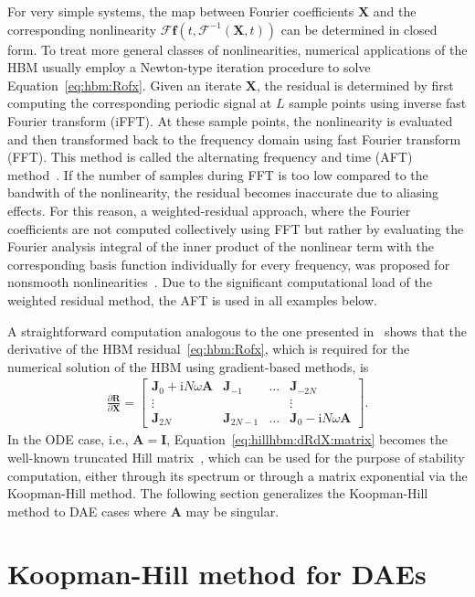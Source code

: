 \documentclass[a4paper, nonatbib, 3p, twocolumn]{elsarticle}
\theoremstyle{plain}
\theoremstyle{definition}
\theoremstyle{remark}
\newcommand{\pd}[2]{\frac{\partial #1}{\partial #2}}
\newcommand{\ic}{\ri} %
\newcommand{\ri}{\mathrm i}
\newcommand{\vf}{\mathbf f}
\newcommand{\vA}{\mathbf A}
\newcommand{\vI}{\mathbf I}
\newcommand{\vJ}{\mathbf J}
\newcommand{\vR}{\mathbf R}
\newcommand{\vX}{\mathbf X}
\newcommand{\cF}{\mathcal{F}}
\begin{document}
For very simple systems, the map between Fourier coefficients $\vX$ and the corresponding nonlinearity $\cF \vf\left(t, \cF^{-1}(\vX, t)\right)$ can be determined in closed form.
To treat more general classes of nonlinearities, numerical applications of the HBM usually employ a Newton-type iteration procedure to solve Equation~\eqref{eq:hbm:Rofx}.
Given an iterate $\vX$, the residual is determined by first computing the corresponding periodic signal at $L$ sample points using inverse fast Fourier transform (iFFT).
At these sample points, the nonlinearity is evaluated  and then transformed back to the frequency domain using fast Fourier transform (FFT). This method is called the alternating frequency and time (AFT) method~\cite{Cameron1989}. If the number of samples during FFT is too low compared to the bandwith of the nonlinearity, the residual becomes inaccurate due to aliasing effects. For this reason, a weighted-residual approach, where the Fourier coefficients are not computed collectively using FFT but rather by evaluating the Fourier analysis integral of the inner product of the nonlinear term with the corresponding basis function individually for every frequency, was proposed for nonsmooth nonlinearities~\cite{Legrand2024,Hashemi2025}. Due to the significant computational load of the weighted residual method, the AFT is used in all examples below.

 A straightforward computation analogous to the one presented in~\cite{Bayer2024} shows that the derivative of the HBM residual~\eqref{eq:hbm:Rofx}, which is required for the numerical solution of the HBM using gradient-based methods, is
 \begin{align}\label{eq:hillhbm:dRdX:matrix}
   \pd{\vR}{\vX} = \begin{bmatrix}
        \vJ_0 + \ic N \omega \vA & \vJ_{-1} & \dots & \vJ_{-2N}	\\	
		\vdots & & & \vdots\\
		\vJ_{2N} &  \vJ_{2N-1} & \dots & \vJ_0 - \ic N \omega \vA
    \end{bmatrix}.
\end{align}
In the ODE case, i.e., $\vA = \vI$, Equation~\eqref{eq:hillhbm:dRdX:matrix} becomes the well-known truncated Hill matrix~\cite{Lazarus2010}, which can be used for the purpose of stability computation, either through its spectrum or through a matrix exponential via the Koopman-Hill method. The following section generalizes the Koopman-Hill method to DAE cases where $\vA$ may be singular.

\section{Koopman-Hill method for DAEs}\label{ch:KHDAE}
\end{document}
